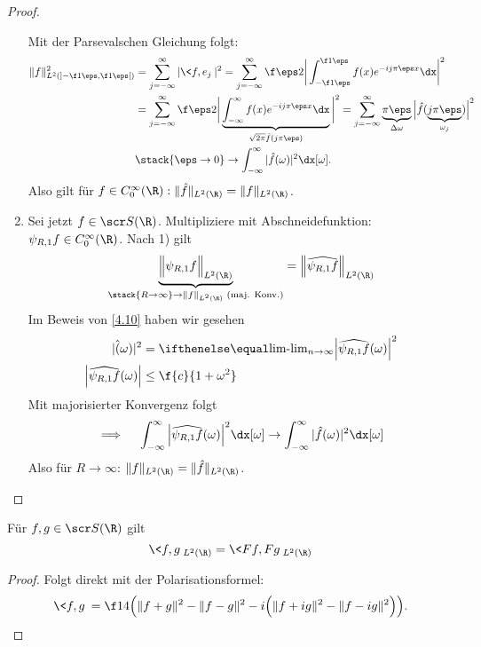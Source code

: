 \begin{st}
\begin{proof}
\begin{enumerate}[1)]
				Mit der Parsevalschen Gleichung folgt:
				\begin{align*}
					\|f\|_{L^2(]-\f 1\eps, \f 1\eps[)}^2
					&= \sum_{j=-\infty}^\infty |\<f,e_j\>|^2
					= \sum_{j=-\infty}^\infty \f \eps 2 \bigg| \int_{-\f 1\eps}^{\f 1\eps} f(x) e^{-ij\pi \eps x} \dx \bigg|^2 \\
					&= \sum_{j=-\infty}^\infty \f \eps 2 \bigg| \underbrace{\int_{-\infty}^{\infty} f(x) e^{-ij\pi \eps x} \dx}_{\sqrt{2\pi} \hat f (j\pi \eps)} \bigg|^2
					= \sum_{j=-\infty}^\infty \underbrace{\pi \eps}_{\Delta \omega} \Big| \hat f(\underbrace{j\pi \eps}_{\omega_j})\Big|^2 \\
					&\stack{\eps \to 0}\to \int_{-\infty}^\infty |\hat f(\omega)|^2 \dx[\omega].
				\end{align*}
				Also gilt für $f \in C_0^\infty(\R) : \|\hat f\|_{L^2(\R)} = \|f\|_{L^2(\R)}$.
			\item
				Sei jetzt $f \in \scr S(\R)$.
				Multipliziere mit Abschneidefunktion: $\psi_{R,1} f \in C_0^\infty(\R)$.
				Nach 1) gilt
				\[
					\underbrace{\Big\|\psi_{R,1} f\Big\|_{L^2(\R)}}_{\stack{R\to \infty}\to \|f\|_{L^2(\R)} \text{ (maj. Konv.)}} = \Big\| \widehat{\psi_{R,1} f} \Big\|_{L^2(\R)}
				\]
				Im Beweis von \ref{4.10} haben wir gesehen
				\begin{align*}
					|\hat(\omega)|^2 &= \lim_{n\to\infty}\Big| \widehat{\psi_{R,1}f}(\omega) \Big|^2 \\
					\Big| \widehat{\psi_{R,1} f}(\omega) \Big| &\le \f {c}{1+\omega^2}
				\end{align*}
				Mit majorisierter Konvergenz folgt
				\[
					\implies \quad \int_{-\infty}^\infty \Big| \widehat{\psi_{R,1}f}(\omega)\Big|^2 \dx[\omega] \to \int_{-\infty}^\infty |\hat f(\omega)|^2 \dx[\omega]
				\]
				Also für $R \to \infty$: $\|f\|_{L^2(\R)} = \|\hat f\|_{L^2(\R)}$.
		\end{enumerate}
	\end{proof}
\end{st}

\begin{kor} \label{4.16}
	Für $f,g \in \scr S(\R)$ gilt
	\[
		\<f,g\>_{L^2(\R)} = \< Ff, Fg\>_{L^2(\R)}
	\]
	\begin{proof}
		Folgt direkt mit der Polarisationsformel:
		\[
			\<f,g\> = \f 14 \Big( \|f+g\|^2 - \|f-g\|^2 - i \Big(\|f+ig\|^2 - \|f-ig\|^2 \Big) \Big).
		\]
	\end{proof}
\end{kor}

